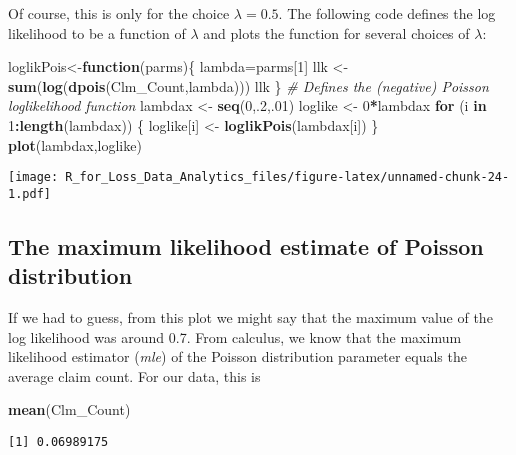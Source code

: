 \documentclass[]{book}
\newenvironment{Shaded}{\begin{snugshade}}{\end{snugshade}}
\newcommand{\KeywordTok}[1]{\textcolor[rgb]{0.13,0.29,0.53}{\textbf{#1}}}
\newcommand{\DecValTok}[1]{\textcolor[rgb]{0.00,0.00,0.81}{#1}}
\newcommand{\StringTok}[1]{\textcolor[rgb]{0.31,0.60,0.02}{#1}}
\newcommand{\CommentTok}[1]{\textcolor[rgb]{0.56,0.35,0.01}{\textit{#1}}}
\newcommand{\ControlFlowTok}[1]{\textcolor[rgb]{0.13,0.29,0.53}{\textbf{#1}}}
\newcommand{\OperatorTok}[1]{\textcolor[rgb]{0.81,0.36,0.00}{\textbf{#1}}}
\newcommand{\NormalTok}[1]{#1}
\theoremstyle{definition}
\theoremstyle{definition}
\theoremstyle{definition}
\theoremstyle{remark}
\begin{document}
Of course, this is only for the choice \(\lambda = 0.5\). The following
code defines the log likelihood to be a function of \(\lambda\) and
plots the function for several choices of \(\lambda\):

\begin{Shaded}
\begin{Highlighting}[]
\NormalTok{loglikPois<-}\ControlFlowTok{function}\NormalTok{(parms)\{ }
\NormalTok{  lambda=parms[}\DecValTok{1}\NormalTok{]}
\NormalTok{  llk <-}\StringTok{ }\KeywordTok{sum}\NormalTok{(}\KeywordTok{log}\NormalTok{(}\KeywordTok{dpois}\NormalTok{(Clm_Count,lambda)))}
\NormalTok{  llk}
\NormalTok{\} }\CommentTok{# Defines the (negative) Poisson loglikelihood function}
\NormalTok{lambdax <-}\StringTok{ }\KeywordTok{seq}\NormalTok{(}\DecValTok{0}\NormalTok{,.}\DecValTok{2}\NormalTok{,.}\DecValTok{01}\NormalTok{)}
\NormalTok{loglike <-}\StringTok{ }\DecValTok{0}\OperatorTok{*}\NormalTok{lambdax}
\ControlFlowTok{for}\NormalTok{ (i }\ControlFlowTok{in} \DecValTok{1}\OperatorTok{:}\KeywordTok{length}\NormalTok{(lambdax)) }
\NormalTok{  \{}
\NormalTok{  loglike[i] <-}\StringTok{ }\KeywordTok{loglikPois}\NormalTok{(lambdax[i])}
\NormalTok{\}}
\KeywordTok{plot}\NormalTok{(lambdax,loglike)}
\end{Highlighting}
\end{Shaded}

\texttt{[image: R\_for\_Loss\_Data\_Analytics\_files/figure-latex/unnamed-chunk-24-1.pdf]}

\subsection{The maximum likelihood estimate of Poisson
distribution}\label{the-maximum-likelihood-estimate-of-poisson-distribution}

If we had to guess, from this plot we might say that the maximum value
of the log likelihood was around 0.7. From calculus, we know that the
maximum likelihood estimator (\emph{mle}) of the Poisson distribution
parameter equals the average claim count. For our data, this is

\begin{Shaded}
\begin{Highlighting}[]
\KeywordTok{mean}\NormalTok{(Clm_Count)}
\end{Highlighting}
\end{Shaded}

\begin{verbatim}
[1] 0.06989175
\end{verbatim}
\end{document}
